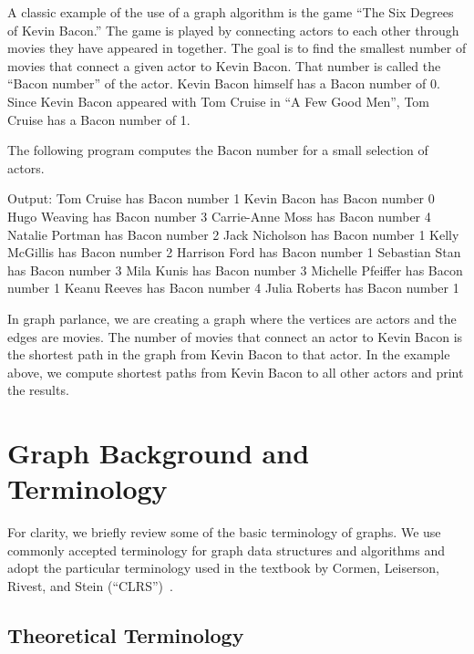 A classic example of the use of a graph algorithm is the game ``The Six Degrees of Kevin Bacon.''
The game is played by connecting actors to each other through movies they have appeared in together.
The goal is to find the smallest number of movies that connect a given actor to Kevin Bacon.
That number is called the ``Bacon number'' of the actor. Kevin Bacon himself has a Bacon number of 0.
Since Kevin Bacon appeared with Tom Cruise in ``A Few Good Men'', Tom Cruise has a Bacon number of 1.

The following program computes the Bacon number for a small selection of actors.

{\small
  
}

  Output:
  { \small
Tom Cruise has Bacon number 1
Kevin Bacon has Bacon number 0
Hugo Weaving has Bacon number 3
Carrie-Anne Moss has Bacon number 4
Natalie Portman has Bacon number 2
Jack Nicholson has Bacon number 1
Kelly McGillis has Bacon number 2
Harrison Ford has Bacon number 1
Sebastian Stan has Bacon number 3
Mila Kunis has Bacon number 3
Michelle Pfeiffer has Bacon number 1
Keanu Reeves has Bacon number 4
Julia Roberts has Bacon number 1    
    }

In graph parlance, we are creating a graph where the vertices are actors and the edges are movies.
The number of movies that connect an actor to Kevin Bacon is the shortest path in the graph
from Kevin Bacon to that actor. In the example above, we compute shortest paths from Kevin
Bacon to all other actors and print the results.


\section{Graph Background and Terminology}

For clarity, we briefly review some of the basic terminology of graphs.
We use commonly accepted terminology for graph data structures and algorithms and
adopt the particular terminology used in the textbook by
Cormen, Leiserson, Rivest, and Stein (``CLRS'')~\cite{CLRS2022}.

\subsection{Theoretical Terminology}

